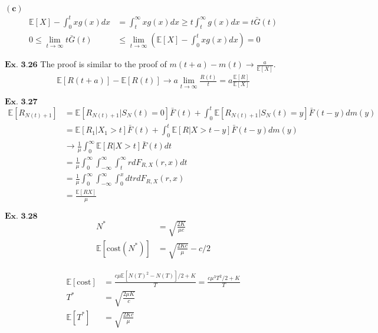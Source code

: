 \documentclass{article}
\begin{document}
$\mathbf{(c)}$
\begin{align*}
\mathbb{E}[X] - \int_{0}^{t}xg(x)dx &= \int_{t}^{\infty}xg(x)dx \geq t\int_{t}^{\infty}g(x)dx = t\bar{G}(t)\\
0 \leq \lim_{t\rightarrow\infty}t\bar{G}(t) &\leq \lim_{t\rightarrow\infty} \left(\mathbb{E}[X]-\int_{0}^{t}xg(x)dx\right) = 0
\end{align*}

\vspace{0.2in}
${\textbf{Ex. 3.26}}$
The proof is similar to the proof of $m(t+a)-m(t)\rightarrow \frac{a}{\mathbb{E}[X]}$.
\begin{align*}
\mathbb{E}[R(t+a)] - \mathbb{E}[R(t)] \rightarrow a\lim_{t\rightarrow \infty}\frac{R(t)}{t} = a\frac{\mathbb{E}[R]}{\mathbb{E}[X]}
\end{align*}

\vspace{0.2in}
${\textbf{Ex. 3.27}}$
\begin{align*}
\mathbb{E}[R_{N(t)+1}] &= \mathbb{E}[R_{N(t)+1}|S_{N}(t) = 0]\bar{F}(t) + \int_{0}^{t}\mathbb{E}[R_{N(t)+1}|S_{N}(t)=y]\bar{F}(t-y)dm(y)\\
&= \mathbb{E}[R_1|X_1>t]\bar{F}(t) + \int_{0}^{t}\mathbb{E}[R|X>t-y]\bar{F}(t-y)dm(y)\\
&\rightarrow \frac{1}{\mu}\int_{0}^{\infty}\mathbb{E}[R|X>t]\bar{F}(t)dt\\
&= \frac{1}{\mu}\int_{0}^{\infty}\int_{-\infty}^{\infty}\int_{t}^{\infty}rdF_{R,X}(r,x)dt\\
&= \frac{1}{\mu}\int_{0}^{\infty}\int_{-\infty}^{\infty}\int_{0}^{x}dtrdF_{R,X}(r,x)\\
&= \frac{\mathbb{E}[RX]}{\mu}
\end{align*}

\vspace{0.2in}
${\textbf{Ex. 3.28}}$
\begin{align*}
N^{*} &= \sqrt{\frac{2K}{\mu c}}\\
\mathbb{E}[\text{cost}(N^*)] &= \sqrt{\frac{2Kc}{\mu}}-c/2
\end{align*}

\begin{align*}
\mathbb{E}[\text{cost}] &= \frac{c\mu\mathbb{E}[N(T)^2-N(T)]/2+K}{T} = \frac{c\mu^3T^2/2+K}{T}\\
T^* &= \sqrt{\frac{2\mu K}{c}}\\
\mathbb{E}[T^*] &= \sqrt{\frac{2Kc}{\mu}}
\end{align*}
\end{document}
